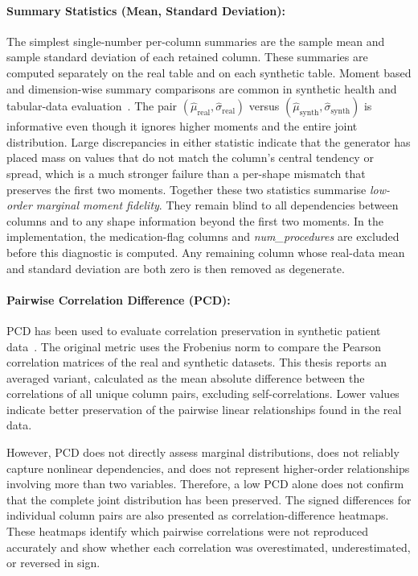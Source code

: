 \paragraph{Summary Statistics (Mean, Standard Deviation):}
\label{sec:eval:utility:similarity:stats}
The simplest single-number per-column summaries are the sample mean and 
sample standard deviation of each retained column. These summaries are 
computed separately on the real table and on each synthetic table. Moment based and
dimension-wise summary comparisons are common in synthetic health and
tabular-data evaluation~\cite{hernandez2022synthetic,Murtaza2023,lautrup2025syntheval}.
The pair
$(\hat{\mu}_{\mathrm{real}}, \hat{\sigma}_{\mathrm{real}})$ versus
$(\hat{\mu}_{\mathrm{synth}}, \hat{\sigma}_{\mathrm{synth}})$ is
informative even though it ignores higher moments and the entire
joint distribution. Large discrepancies in either statistic indicate
that the generator has placed mass on values that do not match the
column's central tendency or spread, which is a much stronger failure
than a per-shape mismatch that preserves the first two moments. Together
these two statistics summarise \emph{low-order marginal moment fidelity}.
They remain blind to all dependencies between columns and to any shape
information beyond the first two moments. In the implementation, the
medication-flag columns and \emph{num\_procedures} are excluded before
this diagnostic is computed. Any remaining column whose real-data mean
and standard deviation are both zero is then removed as degenerate.

\paragraph{Pairwise Correlation Difference (PCD):}
\label{sec:eval:utility:similarity:pcd}

PCD has been used to evaluate correlation preservation in synthetic
patient data~\cite{goncalves2020generation}. The original metric uses
the Frobenius norm to compare the Pearson correlation matrices of the
real and synthetic datasets. This thesis reports an averaged variant,
calculated as the mean absolute difference between the correlations of
all unique column pairs, excluding self-correlations. Lower values
indicate better preservation of the pairwise linear relationships found
in the real data.

However, PCD does not directly assess marginal distributions, does not
reliably capture nonlinear dependencies, and does not represent
higher-order relationships involving more than two variables. Therefore,
a low PCD alone does not confirm that the complete joint distribution
has been preserved. The signed differences for individual column pairs are also presented
as correlation-difference heatmaps. These heatmaps identify which
pairwise correlations were not reproduced accurately and show whether
each correlation was overestimated, underestimated, or reversed in sign.


